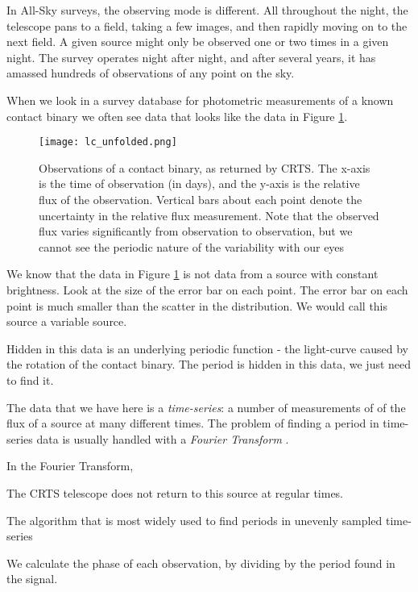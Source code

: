 \documentclass[12pt]{article} %
\numberwithin{equation}{section} %
\begin{document}
In All-Sky surveys, the observing mode is different. All throughout the night, the telescope pans to a field, taking a few images, and then rapidly moving on to the next field. A given source might only be observed one or two times in a given night. The survey operates night after night, and after several years, it has amassed hundreds of observations of any point on the sky.

When we look in a survey database for photometric measurements of a known contact binary we often see data that looks like the data in Figure \ref{fig: lc_unfolded}. 

\begin{figure}[H]
\centering
\texttt{[image: lc\_unfolded.png]}
\caption{Observations of a contact binary, as returned by CRTS. The x-axis is the time of observation (in days), and the y-axis is the relative flux of the observation. Vertical bars about each point denote the uncertainty in the relative flux measurement. Note that the observed flux varies significantly from observation to observation, but we cannot see the periodic nature of the variability with our eyes}
\label{fig: lc_unfolded}
\end{figure}

We know that the data in Figure \ref{fig: lc_unfolded} is not data from a source with constant brightness. Look at the size of the error bar on each point. The error bar on each point is much smaller than the scatter in the distribution. We would call this source a variable source.


Hidden in this data is an underlying periodic function - the light-curve caused by the rotation of the contact binary. The period is hidden in this data, we just need to find it.

The data that we have here is a \emph{time-series}: a number of measurements of of the flux of a source at many different times. The problem of finding a period in time-series data is usually handled with a \emph{Fourier Transform} .

In the Fourier Transform, 

The CRTS telescope does not return to this source at regular times.

The algorithm that is most widely used to find periods in unevenly sampled time-series \citet{scargle1982studies}

We calculate the phase of each observation, by dividing by the period found in the signal.
\end{document}
